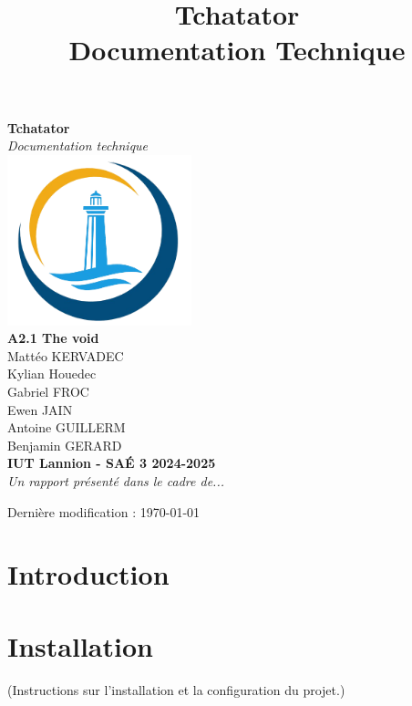 \documentclass{report}
\title{\Huge Tchatator \\ {\LARGE Documentation Technique}}
\begin{document}
\begin{titlepage}
    \begin{center}
        {\Huge\bfseries Tchatator} \\[1cm]
        {\Large\textit{Documentation technique}} \\[2cm]

        \includegraphics[width=0.4\textwidth]{../../../html/img/logo.png} \\[2cm]

        {\Large \textbf{A2.1 The void}} \\ [.2cm]
        {\large Mattéo KERVADEC } \\[.2cm]
        {\large Kylian Houedec } \\[.2cm]
        {\large Gabriel FROC } \\[.2cm]
        {\large Ewen JAIN } \\[.2cm]
        {\large Antoine GUILLERM } \\[.2cm]
        {\large Benjamin GERARD } \\[1cm]

        \textbf{IUT Lannion - SAÉ 3 2024-2025} \\[1.2cm]

        \textit{Un rapport présenté dans le cadre de...} \\[2cm]

        \vfill  %

        {\small Dernière modification : \today}
    \end{center}
\end{titlepage}

\tableofcontents
\newpage
\section{Introduction}

\section{Installation}
(Instructions sur l'installation et la configuration du projet.)
\end{document}
